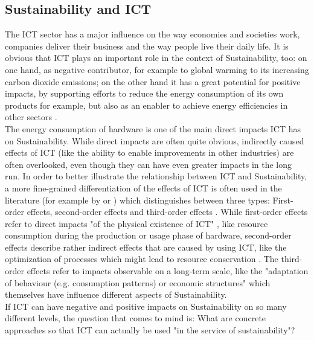 \documentclass[oribibl]{llncs}
\begin{document}
\subsection{Sustainability and ICT}
The ICT sector has a major influence on the way economies and societies work, companies deliver their business and the way people live their daily life. It is obvious that ICT plays an important role in the context of Sustainability, too: on one hand, as negative contributor, for example to global warming to its increasing carbon dioxide emissions; on the other hand it has a great potential for positive impacts, by supporting efforts to reduce the energy consumption of its own products for example, but also as an enabler to achieve energy efficiencies in other sectors \cite{smart2020}.\\
The energy consumption of hardware is one of the main direct impacts ICT has on Sustainability. While direct impacts are often quite obvious, indirectly caused effects of ICT (like the ability to enable improvements in other industries) are often overlooked, even though they can have even greater impacts in the long run. In order to better illustrate the relationship between ICT and Sustainability, a more fine-grained differentiation of the effects of ICT is often used in the literature (for example by \cite{hilty_relevance_2006} or \cite{naumann_greensoft_2011}) which distinguishes between three types: First-order effects, second-order effects and third-order effects \cite{berkhout_impacts_2001}. While first-order effects refer to direct impacts "of the physical existence of ICT" \cite{hilty_relevance_2006}, like resource consumption during the production or usage phase of hardware, second-order effects describe rather indirect effects that are caused by using ICT, like the optimization of processes which might lead to resource conservation \cite{naumann_greensoft_2011}. The third-order effects refer to impacts observable on a long-term scale, like the "adaptation of behaviour (e.g. consumption patterns) or economic structures" \cite{hilty_relevance_2006} which themselves have influence different aspects of Sustainability.\\  %
If ICT can have negative and positive impacts on Sustainability on so many different levels, the question that comes to mind is: What are concrete approaches so that ICT can actually be used "in the service of sustainability"\cite[p.\,5]{hilty11}?\\
\end{document}
